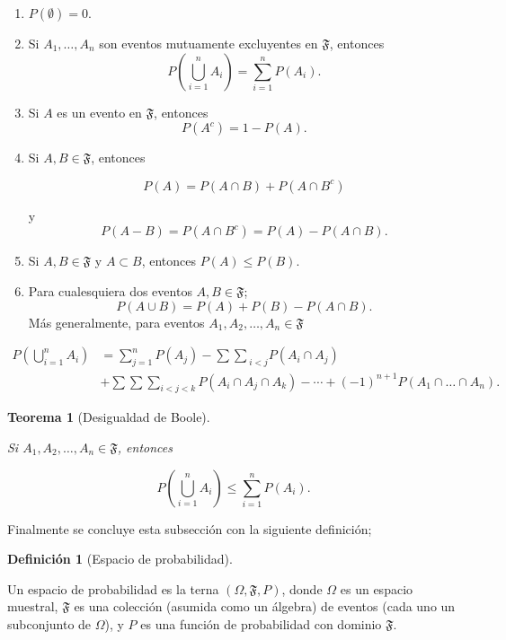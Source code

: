 \documentclass[
  us-letterpaper,
]{scrreprt}
\theoremstyle{plain}
\newtheorem{theorem}{Teorema}[chapter]
\theoremstyle{definition}
\newtheorem{definition}{Definición}[chapter]
\theoremstyle{definition}
\theoremstyle{plain}
\theoremstyle{remark}
\begin{document}
\begin{enumerate}
\def\labelenumi{\roman{enumi}.}
\item
  \(P(\emptyset)=0\).
\item
  Si \(A_1, \ldots, A_n\) son eventos mutuamente excluyentes en
  \(\mathfrak{F}\), entonces
  \[P\left(\bigcup\limits_{i=1}^n A_i\right)= \sum\limits_{i=1}^n P(A_i).\]
\item
  Si \(A\) es un evento en \(\mathfrak{F}\), entonces
  \[P(A^c)= 1-P(A).\]
\item
  Si \(A,B\in\mathfrak{F}\), entonces

  \[P(A)= P(A\cap B)+ P(A\cap B^c)\]

  y \[P(A-B)=P(A\cap B^c)= P(A)-P(A\cap B).\]
\item
  Si \(A,B\in \mathfrak{F}\) y \(A\subset B\), entonces
  \(P(A)\leq P(B)\).
\item
  Para cualesquiera dos eventos \(A,B\in \mathfrak{F}\);
  \[P(A\cup B)= P(A)+P(B)-P(A\cap B).\]Más generalmente, para eventos
  \(A_1, A_2, \ldots, A_n\in \mathfrak{F}\)
\end{enumerate}

\[ \begin{split}P\left(\bigcup\limits_{i=1}^n A_i\right) & = \sum_{j=1}^nP(A_j)-{\sum\sum}_{i<j} P(A_i\cap A_j)\\ &+\sum\sum\sum_{i<j<k}P(A_i\cap A_j\cap A_k) -\cdots+(-1)^{n+1}P(A_1\cap \ldots\cap A_n).\end{split} \]

\begin{theorem}[Desigualdad de
Boole]\protect\hypertarget{thm-boole}{}\label{thm-boole}

Si \(A_1, A_2, \ldots, A_n\in\mathfrak{F}\), entonces

\[P\left(\bigcup_{i=1}^n A_i\right)\leq \sum_{i=1}^n P(A_i).\]

\end{theorem}

Finalmente se concluye esta subsección con la siguiente definición;

\begin{definition}[Espacio de
probabilidad]\protect\hypertarget{def-Ep}{}\label{def-Ep}

Un espacio de probabilidad es la terna \((\Omega, \mathfrak{F}, P)\),
donde \(\Omega\) es un espacio muestral, \(\mathfrak{F}\) es una
colección (asumida como un álgebra) de eventos (cada uno un subconjunto
de \(\Omega\)), y \(P\) es una función de probabilidad con dominio
\(\mathfrak{F}\).

\end{definition}
\end{document}
